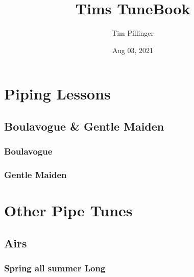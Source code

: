 \documentclass[letterpaper,10pt,english]{sphinxmanual}
\title{Tims TuneBook}
\date{Aug 03, 2021}
\author{Tim Pillinger}
\begin{document}
\pagestyle{empty}
\sphinxmaketitle
\pagestyle{plain}
\sphinxtableofcontents
\pagestyle{normal}
\label{\detokenize{index::doc}}


\noindent{}


\chapter{Piping Lessons}
\label{\detokenize{Piping Lessons/index:piping-lessons}}\label{\detokenize{Piping Lessons/index::doc}}

\section{Boulavogue \& Gentle Maiden}
\label{\detokenize{Piping Lessons/Boulavogue:boulavogue-gentle-maiden}}\label{\detokenize{Piping Lessons/Boulavogue::doc}}

\subsection{Boulavogue}
\label{\detokenize{Piping Lessons/Boulavogue:boulavogue}}
\noindent{}


\subsection{Gentle Maiden}
\label{\detokenize{Piping Lessons/Boulavogue:gentle-maiden}}
\noindent{}


\chapter{Other Pipe Tunes}
\label{\detokenize{Pipe Tunes/index:other-pipe-tunes}}\label{\detokenize{Pipe Tunes/index::doc}}

\section{Airs}
\label{\detokenize{Pipe Tunes/Spring all Summer Long:airs}}\label{\detokenize{Pipe Tunes/Spring all Summer Long::doc}}

\subsection{Spring all summer Long}
\label{\detokenize{Pipe Tunes/Spring all Summer Long:spring-all-summer-long}}
\noindent{}
\end{document}
